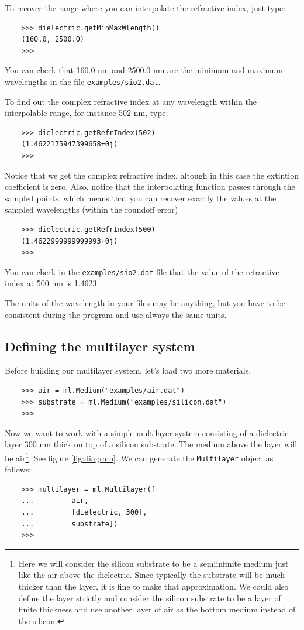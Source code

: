 \documentclass[a4paper,11pt,aps,final]{revtex4}
\begin{document}
To recover the range where you can interpolate the refractive index, just type:
\begin{verbatim}
    >>> dielectric.getMinMaxWlength()
    (160.0, 2500.0)
    >>>
\end{verbatim}

You can check that 160.0 nm and 2500.0 nm are the minimum and maximum wavelengths in the file \texttt{examples/sio2.dat}.

To find out the complex refractive index at any wavelength within the interpolable range, for instance 502 nm, type:
\begin{verbatim}
    >>> dielectric.getRefrIndex(502)
    (1.4622175947399658+0j)
    >>>
\end{verbatim}

Notice that we get the complex refractive index, altough in this case the extintion coefficient is zero. Also, notice that the interpolating function passes through the sampled points, which means that you can recover exactly the values at the sampled wavelengths (within the roundoff error)
\begin{verbatim}
    >>> dielectric.getRefrIndex(500)
    (1.4622999999999993+0j)
    >>>
\end{verbatim}

You can check in the \texttt{examples/sio2.dat} file that the value of the refractive index at 500 nm is 1.4623.

The units of the wavelength in your files may be anything, but you have to be consistent during the program and use always the same units.

\subsection{Defining the multilayer system} \label{sub:define_multilayer}
Before building our multilayer system, let's load two more materials.
\begin{verbatim}
    >>> air = ml.Medium("examples/air.dat")
    >>> substrate = ml.Medium("examples/silicon.dat")
    >>>
\end{verbatim}

Now we want to work with a simple multilayer system consisting of a dielectric layer 300 nm thick on top of a silicon substrate. The medium above the layer will be air\footnote{Here we will consider the silicon substrate to be a semiinfinite medium just like the air above the dielectric. Since typically the substrate will be much thicker than the layer, it is fine to make that approximation. We could also define the layer strictly and consider the silicon substrate to be a layer of finite thickness and use another layer of air as the bottom medium instead of the silicon.}. See figure \ref{fig:diagram}. We can generate the \texttt{Multilayer} object as follows:
\begin{verbatim}
    >>> multilayer = ml.Multilayer([
    ...         air,
    ...         [dielectric, 300],
    ...         substrate])
    >>>
\end{verbatim}
\end{document}
